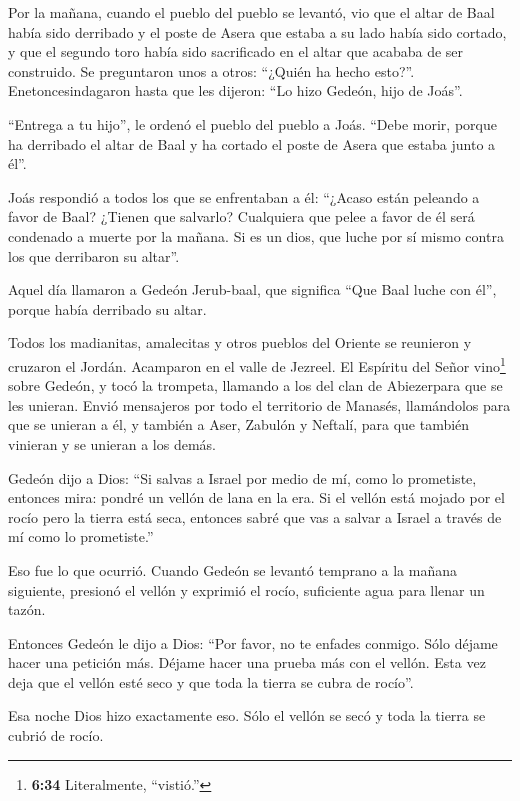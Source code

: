  Por la mañana, cuando el pueblo del pueblo se levantó, vio
que el altar de Baal había sido derribado y el poste de Asera que estaba
a su lado había sido cortado, y que el segundo toro había sido
sacrificado en el altar que acababa de ser construido.  Se
preguntaron unos a otros: ``¿Quién ha hecho esto?''. Enetoncesindagaron
hasta que les dijeron: ``Lo hizo Gedeón, hijo de Joás''.

 ``Entrega a tu hijo'', le ordenó el pueblo del pueblo a
Joás. ``Debe morir, porque ha derribado el altar de Baal y ha cortado el
poste de Asera que estaba junto a él''.

 Joás respondió a todos los que se enfrentaban a él:
``¿Acaso están peleando a favor de Baal? ¿Tienen que salvarlo?
Cualquiera que pelee a favor de él será condenado a muerte por la
mañana. Si es un dios, que luche por sí mismo contra los que derribaron
su altar''.

 Aquel día llamaron a Gedeón Jerub-baal, que significa
``Que Baal luche con él'', porque había derribado su altar.

 Todos los madianitas, amalecitas y otros pueblos del
Oriente se reunieron y cruzaron el Jordán. Acamparon en el valle de
Jezreel.  El Espíritu del Señor vino\footnote{\textbf{6:34}
  Literalmente, ``vistió.''} sobre Gedeón, y tocó la trompeta, llamando
a los del clan de Abiezerpara que se les unieran.  Envió
mensajeros por todo el territorio de Manasés, llamándolos para que se
unieran a él, y también a Aser, Zabulón y Neftalí, para que también
vinieran y se unieran a los demás.

 Gedeón dijo a Dios: ``Si salvas a Israel por medio de mí,
como lo prometiste,  entonces mira: pondré un vellón de
lana en la era. Si el vellón está mojado por el rocío pero la tierra
está seca, entonces sabré que vas a salvar a Israel a través de mí como
lo prometiste.''

 Eso fue lo que ocurrió. Cuando Gedeón se levantó temprano
a la mañana siguiente, presionó el vellón y exprimió el rocío,
suficiente agua para llenar un tazón.

 Entonces Gedeón le dijo a Dios: ``Por favor, no te enfades
conmigo. Sólo déjame hacer una petición más. Déjame hacer una prueba más
con el vellón. Esta vez deja que el vellón esté seco y que toda la
tierra se cubra de rocío''.

 Esa noche Dios hizo exactamente eso. Sólo el vellón se
secó y toda la tierra se cubrió de rocío.

